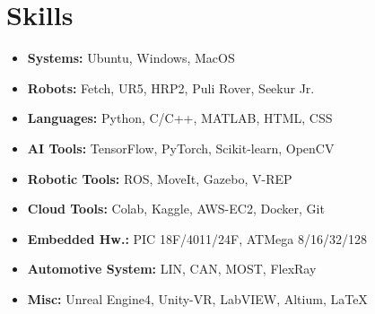 \documentclass[10pt, oneside]{article} %
\begin{document}
\begin{paracol}{2}
\begin{itemize}[leftmargin=*, topsep=0pt, label={}]
\end{itemize}



\section{Skills}

\begin{itemize}[leftmargin=*, topsep=0pt, label={}]
	\item{\textbf{Systems:} Ubuntu, Windows, MacOS}
	\item{\textbf{Robots:} Fetch, UR5, HRP2, Puli Rover, Seekur Jr.}%
	\item{\textbf{Languages:} Python, C/C++, MATLAB, HTML, CSS}
	\item{\textbf{AI Tools:} TensorFlow, PyTorch, Scikit-learn, OpenCV} %
	\item{\textbf{Robotic Tools:} ROS, MoveIt, Gazebo, V-REP} %
    \item{\textbf{Cloud Tools:} Colab, Kaggle, AWS-EC2, Docker, Git}
	\item{\textbf{Embedded Hw.:} PIC 18F/4011/24F, ATMega 8/16/32/128}
    \item{\textbf{Automotive System:} LIN, CAN, MOST, FlexRay}
    \item{\textbf{Misc:}  Unreal Engine4, Unity-VR, LabVIEW, Altium, \LaTeX} 
    
\end{itemize}





\end{paracol}
\end{document}
